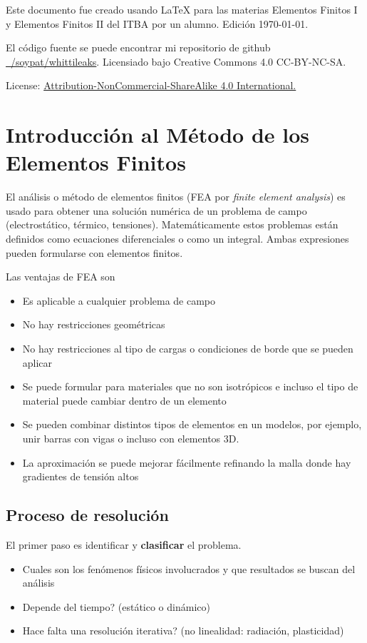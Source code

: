 


 



\tableofcontents
\vspace{1cm}
Este documento fue creado usando \LaTeX{} para las materias Elementos Finitos I y Elementos Finitos II del ITBA por un alumno. Edición \today.

El código fuente se puede encontrar mi repositorio de github \href{https://github.com/soypat/whittileaks}{~/soypat/whittileaks}. Licensiado bajo Creative Commons 4.0 CC-BY-NC-SA.

License: \href{https://creativecommons.org/licenses/by-nc-sa/4.0/}{Attribution-NonCommercial-ShareAlike 4.0 International.} 
\lstlistoflistings

\clearpage

\pagestyle{plain}
\setcounter{page}{1}
\setcounter{section}{-1}
\section{Introducción al Método de los Elementos Finitos}
El análisis o método de elementos finitos (FEA por \textit{finite element analysis}) es usado para obtener una solución numérica de un problema de campo (electrostático, térmico, tensiones). Matemáticamente estos problemas están definidos como ecuaciones diferenciales o como un integral. Ambas expresiones pueden formularse con elementos finitos.

Las ventajas de FEA son
\vspace{-.3cm}
\begin{itemize}
	\item Es aplicable a cualquier problema de campo
	\item No hay restricciones geométricas
	\item No hay restricciones al tipo de cargas o condiciones de borde que se pueden aplicar
	\item Se puede formular para materiales que no son isotrópicos e incluso el tipo de material puede cambiar dentro de un elemento
	\item Se pueden combinar distintos tipos de elementos en un modelos, por ejemplo, unir barras con vigas o incluso con elementos 3D.
	\item La aproximación se puede mejorar fácilmente refinando la malla donde hay gradientes de tensión altos
\end{itemize}
\vspace{-.7cm}
\subsection*{Proceso de resolución}
El primer paso es identificar y \textbf{clasificar} el problema.
\begin{itemize}
	\item Cuales son los fenómenos físicos involucrados y que resultados se buscan del análisis
	\item Depende del tiempo? (estático o dinámico)
	\item Hace falta una resolución iterativa? (no linealidad: radiación, plasticidad)
\end{itemize} 

